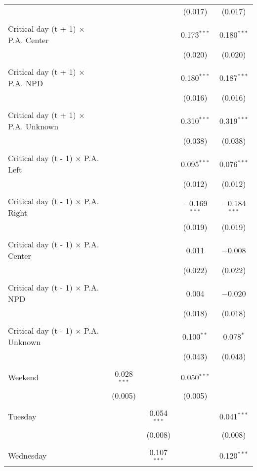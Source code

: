 \documentclass[
]{article}
\begin{document}
\begin{table}[!htbp]
{\begin{tabular}{@{\extracolsep{5pt}}lcccc}
  &  &  & (0.017) & (0.017) \\ 
  & & & & \\ 
 Critical day (t + 1) $\times$ P.A. Center &  &  & 0.173$^{***}$ & 0.180$^{***}$ \\ 
  &  &  & (0.020) & (0.020) \\ 
  & & & & \\ 
 Critical day (t + 1) $\times$ P.A. NPD &  &  & 0.180$^{***}$ & 0.187$^{***}$ \\ 
  &  &  & (0.016) & (0.016) \\ 
  & & & & \\ 
 Critical day (t + 1) $\times$ P.A. Unknown &  &  & 0.310$^{***}$ & 0.319$^{***}$ \\ 
  &  &  & (0.038) & (0.038) \\ 
  & & & & \\ 
 Critical day (t - 1) $\times$ P.A. Left &  &  & 0.095$^{***}$ & 0.076$^{***}$ \\ 
  &  &  & (0.012) & (0.012) \\ 
  & & & & \\ 
 Critical day (t - 1) $\times$ P.A. Right &  &  & $-$0.169$^{***}$ & $-$0.184$^{***}$ \\ 
  &  &  & (0.019) & (0.019) \\ 
  & & & & \\ 
 Critical day (t - 1) $\times$ P.A. Center &  &  & 0.011 & $-$0.008 \\ 
  &  &  & (0.022) & (0.022) \\ 
  & & & & \\ 
 Critical day (t - 1) $\times$ P.A. NPD &  &  & 0.004 & $-$0.020 \\ 
  &  &  & (0.018) & (0.018) \\ 
  & & & & \\ 
 Critical day (t - 1) $\times$ P.A. Unknown &  &  & 0.100$^{**}$ & 0.078$^{*}$ \\ 
  &  &  & (0.043) & (0.043) \\ 
  & & & & \\ 
 Weekend & 0.028$^{***}$ &  & 0.050$^{***}$ &  \\ 
  & (0.005) &  & (0.005) &  \\ 
  & & & & \\ 
 Tuesday &  & 0.054$^{***}$ &  & 0.041$^{***}$ \\ 
  &  & (0.008) &  & (0.008) \\ 
  & & & & \\ 
 Wednesday &  & 0.107$^{***}$ &  & 0.120$^{***}$ \\ 

\end{tabular}}
\end{table}
\end{document}
